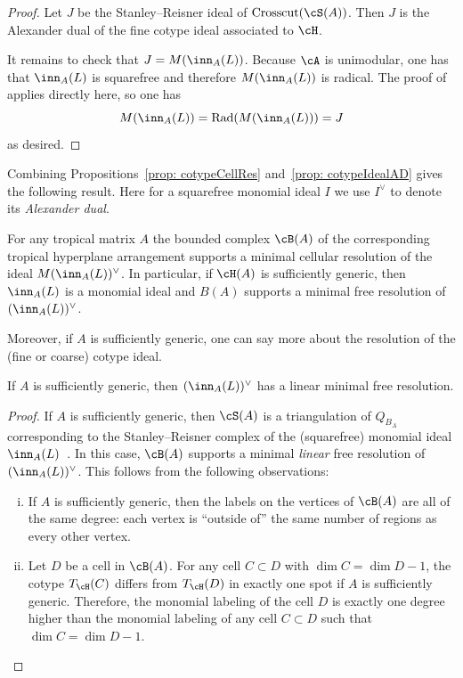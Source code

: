 \begin{proof}
Let $J$ be the Stanley--Reisner ideal of $\textrm{Crosscut}(\cS(A))$. Then $J$ is the Alexander dual of the fine cotype ideal associated to $\cH$.

It remains to check that $J = M(\inn_A(L))$. Because $\cA$ is unimodular, one has that $\inn_A(L)$ is squarefree and therefore $M(\inn_A(L))$ is radical. The proof of~\cite[Lemma 6.7]{dochtermann2012tropical} applies directly here, so one has
$$
M(\inn_A(L)) = \textrm{Rad}(M(\inn_A(L))) = J
$$
as desired.
\end{proof}

Combining Propositions~\ref{prop: cotypeCellRes} and~\ref{prop: cotypeIdealAD} gives the following result.  Here for a squarefree monomial ideal $I$ we use $I^\vee$ to denote its \emph{Alexander dual}.

\begin{cor}\label{cor: cellResDual} For any tropical matrix $A$ the bounded complex $\cB(A)$ of the corresponding tropical hyperplane arrangement supports a minimal cellular resolution of the ideal $M(\inn_A(L))^\vee$. In particular, if $\cH(A)$ is sufficiently generic, then $\inn_A(L)$ is a monomial ideal and $B(A)$ supports a minimal free resolution of $(\inn_A(L))^\vee$.
\end{cor}

Moreover, if $A$ is sufficiently generic, one can say more about the resolution of the (fine or coarse) cotype ideal.

\begin{cor}\label{cor: linearRes} If $A$ is sufficiently generic, then $(\inn_A(L))^\vee$ has a linear minimal free resolution.
\end{cor}

\begin{proof} 
If $A$ is sufficiently generic, then $\cS(A)$ is a triangulation of $Q_{B_A}$ corresponding to the Stanley--Reisner complex of the (squarefree) monomial ideal $\inn_A(L)$~\cite[Theorem 8.3]{sturmfels1996grobner}.
In this case, $\cB(A)$ supports a minimal \emph{linear} free resolution of $(\inn_A(L))^\vee$. This follows from the following observations:
\begin{enumerate}[(i)]
    \item If $A$ is sufficiently generic, then the labels on the vertices of $\cB(A)$ are all of the same degree: each vertex is ``outside of'' the same number of regions as every other vertex.
    \item Let $D$ be a cell in $\cB(A)$. For any cell $C\subset D$ with $\dim C = \dim D - 1$, the cotype $T_{\cH}(C)$ differs from $T_{\cH}(D)$ in exactly one spot if $A$ is sufficiently generic. Therefore, the monomial labeling of the cell $D$ is exactly one degree higher than the monomial labeling of any cell $C\subset D$ such that $\dim C = \dim D - 1$.
\end{enumerate}
\end{proof}

